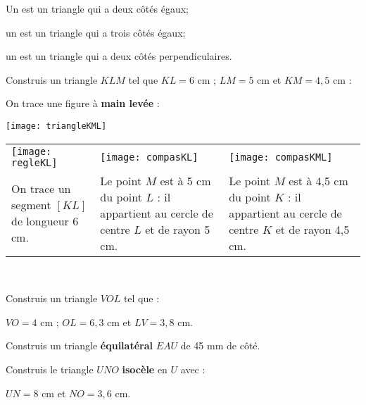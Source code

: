 

\begin{definition}
Un  est un triangle qui a deux côtés égaux;

un  est un triangle qui a trois côtés égaux;

un  est un triangle qui a deux côtés perpendiculaires.
\end{definition}

\begin{methode*1}

\begin{exemple*1}
Construis un triangle $KLM$ tel que $KL = 6$ cm ; $LM = 5$ cm et $KM = 4,5$ cm :

On trace une figure à \textbf{main levée} :
\begin{center} \texttt{[image: triangleKML]} \end{center}

\begin{tabularx}{\textwidth}{X|X|X}
 \texttt{[image: regleKL]} &  \texttt{[image: compasKL]} & \texttt{[image: compasKML]} \\ 
 On trace un segment $[KL]$ de longueur 6 cm. & Le point $M$ est à 5 cm du point $L$ : il appartient au cercle de centre $L$ et de rayon 5 cm. & Le point $M$ est à 4,5 cm du point $K$ : il appartient au cercle de centre $K$ et de rayon 4,5 cm. \\
\end{tabularx} \\

\end{exemple*1}

\exercice 
Construis un triangle $VOL$ tel que :

$VO = 4$ cm ; $OL = 6,3$ cm et $LV = 3,8$ cm.

\vspace{2cm}

\exercice 
Construis un triangle \textbf{équilatéral} $EAU$ de 45 mm de côté.

\vspace{2cm}

\exercice 
Construis le triangle $UNO$ \textbf{isocèle} en $U$ avec :

$UN = 8$ cm et $NO = 3,6$ cm.
 
\end{methode*1}

